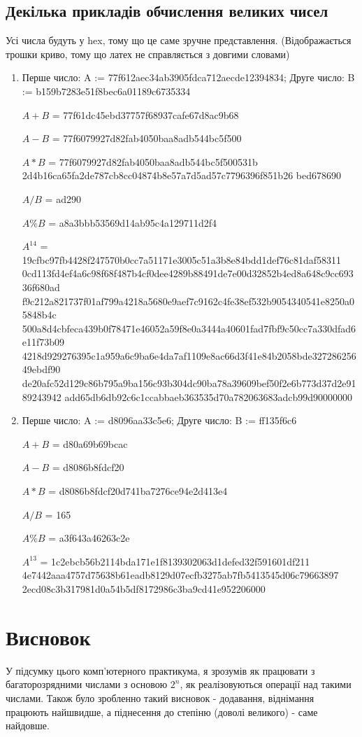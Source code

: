 \documentclass{article}
\begin{document}
\subsection{Декілька прикладів обчислення великих чисел}

Усі числа будуть у hex, тому що це саме зручне представлення. (Відображається трошки криво, тому що латех не справляється з довгими словами)
\begin{enumerate}
\item Перше число: A := 77f612aec34ab3905fdca712aecde12394834; Друге число: B := b159b7283e51f8bec6a01189c6735334

$A + B$ = 77f61dc45ebd37757f68937cafe67d8ac9b68

$A - B$ = 77f6079927d82fab4050baa8adb544bc5f500

$A * B$ = 77f6079927d82fab4050baa8adb544bc5f500531b 2d4b16ca65fa2de787cb8cc04874b8e57a7d5ad57c7796396f851b26 bed678690

$A / B$ = ad290

$A \% B$ = a8a3bbb53569d14ab95c4a129711d2f4

$A ^{14}$ = 19cfbc97fb4428f247570b0cc7a51171e3005c51a3b8e84bdd1def76c81daf58311 0cd113fd4ef4a6c98f68f487b4cf0dee4289b88491de7e00d32852b4ed8a648c9cc69336f680ad f9c212a821737f01af799a4218a5680e9aef7c9162c4fe38ef532b9054340541e8250a05848b4c 500a8d4cbfeca439b0f78471e46052a59f8e0a3444a40601fad7fbf9c50cc7a330dfad6e11f73b09 4218d929276395c1a959a6c9ba6e4da7af1109e8ac66d3f41e84b2058bde32728625649ebdf90 de20afc52d129c86b795a9ba156c93b304dc90ba78a39609bef50f2e6b773d37d2e9189243942 add65db6db92c6c1ccabbaeb363535d70a782063683adcb99d90000000

\item Перше число: A := d8096aa33c5e6; Друге число: B := ff135f6c6

$A + B$ = d80a69b69bcac

$A - B$ = d8086b8fdcf20

$A * B$ = d8086b8fdcf20d741ba7276ce94e2d413e4

$A / B$ = 165

$A \% B$ = a3f643a46263c2e

$A ^{13}$ = 1c2ebcb56b2114bda171e1f8139302063d1defed32f591601df211 4e7442aaa4757d75638b61eadb8129d07ecfb3275ab7fb5413545d06c79663897 2ecd08c3b317981d0a54b5df8172986c3ba9cd41e952206000

\end{enumerate}
\section{Висновок}
	У підсумку цього комп'ютерного практикума, я зрозумів як працювати з багаторозрядними числами з основою $2^n$, як реалізовуються операції над такими числами. Також було зробленно такий висновок - додавання, віднімання працюють найшвидше, а піднесення до степіню (доволі великого) - саме найдовше. 
\end{document}
